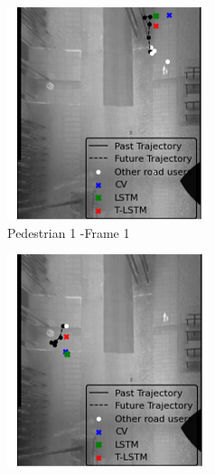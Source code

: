 \documentclass{article}
\begin{document}
\begin{figure}[H]
\centering
\begin{subfigure}{0.3\textwidth}
  \centering
  \includegraphics[width=\linewidth]{quali_results/ped-turn-1.png}
  \caption{Pedestrian 1 -Frame 1}
  \label{fig:ped-turn-1}
\end{subfigure}
\begin{subfigure}{0.3\textwidth}
  \centering
  \includegraphics[width=\linewidth]{quali_results/ped-turn-2.png}

\end{subfigure}
\end{figure}
\end{document}
